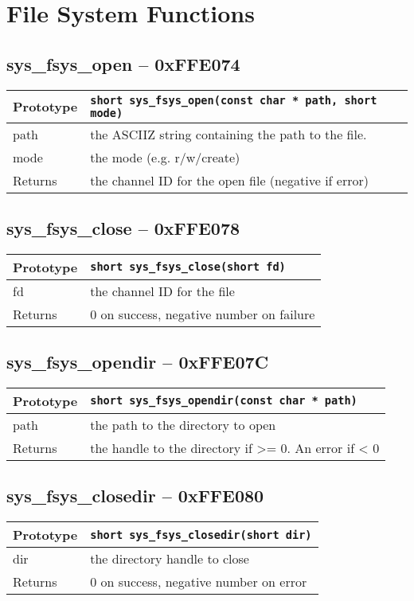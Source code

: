 \section{File System Functions}

\subsection*{sys\_fsys\_open -- 0xFFE074}
\begin{tabular}{|l||l|} \hline
Prototype & \lstinline!short sys_fsys_open(const char * path, short mode)! \\ \hline
path & the ASCIIZ string containing the path to the file. \\ \hline
mode & the mode (e.g. r/w/create) \\ \hline
Returns & the channel ID for the open file (negative if error) \\ \hline
\end{tabular}

\subsection*{sys\_fsys\_close -- 0xFFE078}
\begin{tabular}{|l||l|} \hline
Prototype & \lstinline!short sys_fsys_close(short fd)! \\ \hline
fd & the channel ID for the file \\ \hline
Returns & 0 on success, negative number on failure \\ \hline
\end{tabular}

\subsection*{sys\_fsys\_opendir -- 0xFFE07C}
\begin{tabular}{|l||l|} \hline
Prototype & \lstinline!short sys_fsys_opendir(const char * path)! \\ \hline
path & the path to the directory to open \\ \hline
Returns & the handle to the directory if >= 0. An error if < 0 \\ \hline
\end{tabular}

\subsection*{sys\_fsys\_closedir -- 0xFFE080}
\begin{tabular}{|l||l|} \hline
Prototype & \lstinline!short sys_fsys_closedir(short dir)! \\ \hline
dir & the directory handle to close \\ \hline
Returns & 0 on success, negative number on error \\ \hline
\end{tabular}

